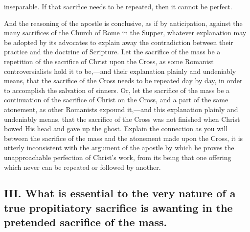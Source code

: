 \documentclass[]{book}
\begin{document}
inseparable. If that sacrifice needs to be repeated, then it cannot be perfect.

And the reasoning of the apostle is conclusive, as if by anticipation, against the many sacrifices of the Church of Rome in the Supper, whatever explanation may be adopted by its advocates to explain away the contradiction between their practice and the doctrine of Scripture. Let the sacrifice of the mass be a repetition of the sacrifice of Christ upon the Cross, as some Romanist controversialists hold it to be,---and their explanation plainly and undeniably means, that the sacrifice of the Cross needs to be repeated day by day, in order to accomplish the salvation of sinners. Or, let the sacrifice of the mass be a continuation of the sacrifice of Christ on the Cross, and a part of the same atonement, as other Romanists expound it,---and this explanation plainly and undeniably means, that the sacrifice of the Cross was not finished when Christ bowed His head and gave up the ghost. Explain the connection as you will between the sacrifice of the mass and the atonement made upon the Cross, it is utterly inconsistent with the argument of the apostle by which he proves the unapproachable perfection of Christ's work, from its being that one offering which never can be repeated or followed by another.

\hypertarget{iii.-what-is-essential-to-the-very-nature-of-a-true-propitiatory-sacrifice-is-awanting-in-the-pretended-sacrifice-of-the-mass.}{%
\subsection{III. What is essential to the very nature of a true propitiatory sacrifice is awanting in the pretended sacrifice of the mass.}\label{iii.-what-is-essential-to-the-very-nature-of-a-true-propitiatory-sacrifice-is-awanting-in-the-pretended-sacrifice-of-the-mass.}}
\end{document}
